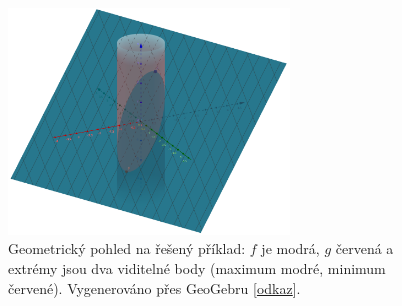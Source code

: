 \documentclass[../main.tex]{subfiles}
\begin{document}
\begin{intuition}
	\begin{figure}[h]
		\centering
		\includegraphics[height=6cm]{05-lag-example}%
		\caption{Geometrický pohled na řešený příklad: \(f\) je modrá, \(g\) červená a extrémy jsou dva viditelné body (maximum modré, minimum červené). Vygenerováno přes GeoGebru [\href{https://www.geogebra.org/3d?lang=en}{odkaz}].}%
		\label{fig:lagex}
	\end{figure}
\end{intuition}
\end{document}
